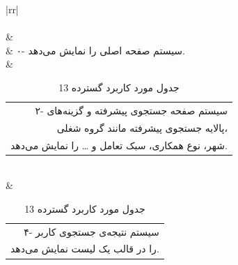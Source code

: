 \documentclass[12pt]{article}
\begin{document}
\begin{center}
		\begin{table}[H]
			\caption{جدول مورد کاربرد گسترده 13}
			\label{tab:ext-uc13}
			\begin{tabular}{|rr|}
				\hline
				\rowcolor{Gainsboro!60}
				                                                                                                                                                                                                                                           \\ \hline
				                                                                                                                                                                                                                                                                             \\ \hline
				                                                                                           &                                                                                                                               \\ \hline
				                                                                                                       & ۰- سیستم صفحه اصلی را نمایش می‌دهد.                                                                                                                                           \\ \hline
				  & \begin{tabular}[c]{@{}r@{}}۲- سیستم صفحه جستجوی پیشرفته و گزینه‌های\\  پالایه جستجوی پیشرفته مانند گروه شغلی،\\  شهر، نوع همکاری، سبک تعامل و … را نمایش می‌دهد.\end{tabular} \\ \hline
				 & \begin{tabular}[c]{@{}r@{}}۴- سیستم نتیجه‌ی جستجوی کاربر\\  را در قالب یک لیست نمایش می‌دهد.\end{tabular}                                                                     \\ \hline

\end{tabular}
\end{table}
\end{center}
\end{document}
